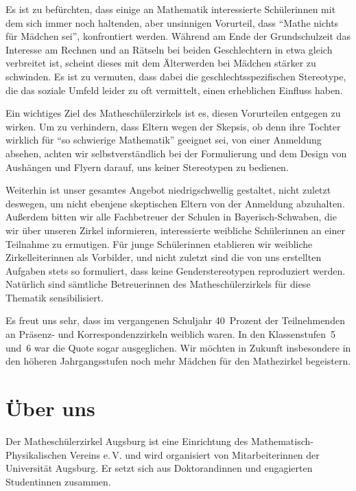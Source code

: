 \documentclass[12pt]{zettel}
\newcommand{\twopics}[2]{%
  \begin{figure}[b]%
    \vspace*{0.5cm}%
    \makebox[\textwidth][c]{%
      \texttt{[image: impressionen/\#1]}%
      \hspace*{1cm}%
      \texttt{[image: impressionen/\#2]}%
    }%
    \vspace*{-1cm}%
  \end{figure}
}
\begin{document}
\newpage

Es ist zu befürchten, dass einige an Mathematik interessierte Schülerinnen mit dem sich immer noch haltenden, aber unsinnigen Vorurteil, dass "`Mathe nichts für Mädchen sei"',
konfrontiert werden. Während am Ende der Grundschulzeit das Interesse am Rechnen und an Rätseln bei beiden Geschlechtern in etwa gleich verbreitet ist, scheint dieses mit
dem Älterwerden bei Mädchen stärker zu schwinden. Es ist zu vermuten, dass dabei die geschlechtsspezifischen Stereotype, die das soziale Umfeld leider zu oft vermittelt, einen
erheblichen Einfluss haben.

Ein wichtiges Ziel des Matheschülerzirkels ist es, diesen Vorurteilen entgegen zu wirken. Um zu verhindern, dass Eltern wegen der Skepsis, ob denn ihre
Tochter wirklich für "`so schwierige Mathematik"' geeignet sei, von einer Anmeldung absehen, achten wir selbstverständlich bei der Formulierung und dem Design von Aushängen und Flyern
darauf, uns keiner Stereotypen zu bedienen.

Weiterhin ist unser gesamtes Angebot niedrigschwellig gestaltet, nicht zuletzt deswegen, um nicht ebenjene skeptischen Eltern
von der Anmeldung abzuhalten. Außerdem bitten wir alle Fachbetreuer der Schulen in Bayerisch-Schwaben, die wir über unseren Zirkel informieren, interessierte weibliche Schülerinnen an
einer Teilnahme zu ermutigen. Für junge Schülerinnen etablieren wir weibliche Zirkelleiterinnen als Vorbilder, und nicht zuletzt sind die von uns erstellten Aufgaben stets so formuliert, dass keine Genderstereotypen reproduziert werden. Natürlich sind sämtliche Betreuerinnen des
Matheschülerzirkels für diese Thematik sensibilisiert.

Es freut uns sehr, dass im vergangenen Schuljahr
40~Prozent der Teilnehmenden an Präsenz- und Korrespondenzzirkeln weiblich waren. In den Klassenstufen~5 und~6 war die Quote sogar ausgeglichen. Wir möchten in Zukunft insbesondere
in den höheren Jahrgangsstufen noch mehr Mädchen für den Mathezirkel begeistern.

\twopics{klein-04}{klein-08}


\section{Über uns}

Der Matheschülerzirkel Augsburg ist eine Einrichtung des
Mathematisch-Phy\-si\-ka\-li\-schen Vereins e.\,V. und wird organisiert von
Mitarbeiterinnen der Universität
Augsburg. Er setzt sich aus Doktorandinnen
und engagierten Studentinnen zusammen.
\end{document}

